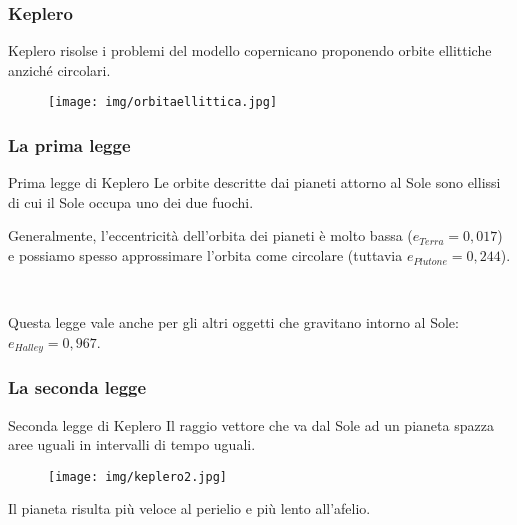 \documentclass[]{beamer}
\theoremstyle{plain}
\begin{document}
\begin{frame}
\frametitle{Keplero}
Keplero risolse i problemi del modello copernicano proponendo \alert{orbite ellittiche} anziché circolari.
\begin{figure}
\texttt{[image: img/orbitaellittica.jpg]}
\end{figure}

\begin{center}
\href{gif/ellisse.gif}{}
\end{center}
\end{frame}


\begin{frame}
\frametitle{La prima legge}
\begin{block}{Prima legge di Keplero}
Le orbite descritte dai pianeti attorno al Sole sono ellissi di cui il Sole occupa uno dei due fuochi.
\end{block}
\begin{center}
\href{gif/keplero1.gif}{}
\end{center}\pause


Generalmente, l'eccentricità dell'orbita dei pianeti è molto bassa ($ e_{Terra} = 0,017 $) e possiamo spesso approssimare l'orbita come circolare (tuttavia $ e_{Plutone} = 0,244 $).\pause

~

Questa legge vale anche per gli altri oggetti che gravitano intorno al Sole: $ e_{Halley} = 0,967 $.
\end{frame}


\begin{frame}
\frametitle{La seconda legge}
\begin{block}{Seconda legge di Keplero}
Il raggio vettore che va dal Sole ad un pianeta spazza aree uguali in intervalli di tempo uguali.
\end{block}
\begin{figure}
\texttt{[image: img/keplero2.jpg]}

\href{gif/keplero2.gif}{}
\end{figure}\pause
Il pianeta risulta più veloce al perielio e più lento all'afelio.
\end{frame}
\end{document}
